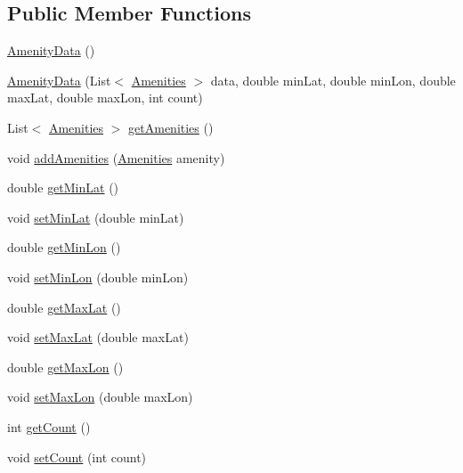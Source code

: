 \subsection*{Public Member Functions}
\begin{DoxyCompactItemize}
\item 
\hyperlink{classbridges_1_1data__src__dependent_1_1_amenity_data_a11f1c1d13fe12ee8b0c3115cb7b817da}{Amenity\+Data} ()
\item 
\hyperlink{classbridges_1_1data__src__dependent_1_1_amenity_data_a06609a93baa3a607662a7a8983ad737e}{Amenity\+Data} (List$<$ \hyperlink{classbridges_1_1data__src__dependent_1_1_amenities}{Amenities} $>$ data, double min\+Lat, double min\+Lon, double max\+Lat, double max\+Lon, int count)
\item 
List$<$ \hyperlink{classbridges_1_1data__src__dependent_1_1_amenities}{Amenities} $>$ \hyperlink{classbridges_1_1data__src__dependent_1_1_amenity_data_ac0d203eeb94b46eadfc8ef0de6ea608a}{get\+Amenities} ()
\item 
void \hyperlink{classbridges_1_1data__src__dependent_1_1_amenity_data_a56ae059c82a63c03d57c9a8fb9081b0c}{add\+Amenities} (\hyperlink{classbridges_1_1data__src__dependent_1_1_amenities}{Amenities} amenity)
\item 
double \hyperlink{classbridges_1_1data__src__dependent_1_1_amenity_data_a187cf87a989605e13a55e30e2609dc4a}{get\+Min\+Lat} ()
\item 
void \hyperlink{classbridges_1_1data__src__dependent_1_1_amenity_data_a6bd9a9039c70fa80f5c346924a4c4340}{set\+Min\+Lat} (double min\+Lat)
\item 
double \hyperlink{classbridges_1_1data__src__dependent_1_1_amenity_data_a3f173c47241615860a89af0cdb2fac29}{get\+Min\+Lon} ()
\item 
void \hyperlink{classbridges_1_1data__src__dependent_1_1_amenity_data_af71873ec7280c3f818ef2c3d51c42d3c}{set\+Min\+Lon} (double min\+Lon)
\item 
double \hyperlink{classbridges_1_1data__src__dependent_1_1_amenity_data_a87f56862648652b9f5479fa1bd2c0fb0}{get\+Max\+Lat} ()
\item 
void \hyperlink{classbridges_1_1data__src__dependent_1_1_amenity_data_ab6a9a4a895d769b2d2d57172ee92537f}{set\+Max\+Lat} (double max\+Lat)
\item 
double \hyperlink{classbridges_1_1data__src__dependent_1_1_amenity_data_ad1ea5be9e72095d1a69ed08f67e1d5f7}{get\+Max\+Lon} ()
\item 
void \hyperlink{classbridges_1_1data__src__dependent_1_1_amenity_data_ae6bf9d416dbac70321d42e0efde5027c}{set\+Max\+Lon} (double max\+Lon)
\item 
int \hyperlink{classbridges_1_1data__src__dependent_1_1_amenity_data_a363ca9b4314fabbfa94cdc4c0f34ac96}{get\+Count} ()
\item 
void \hyperlink{classbridges_1_1data__src__dependent_1_1_amenity_data_a968e067892dc694555c0ba8e5a75c3cf}{set\+Count} (int count)
\end{DoxyCompactItemize}


